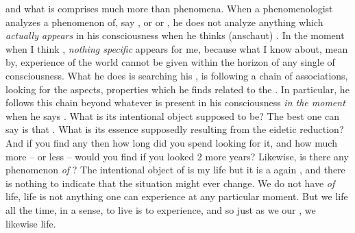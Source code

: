 \pa
{} and what is 
comprises much more than phenomena.  When a phenomenologist analyzes a
phenomenon of, say , or  or , he does not
analyze anything which {\em actually appears} in his consciousness when he
thinks (anschaut) .  In the moment when I think , {\em
  nothing specific} appears for me, because what I know about, mean by,
experience of the world cannot be given within the horizon of any single
 of consciousness.  What he does is searching his , is
following a chain of associations, looking for the aspects, properties which he
finds related to the .  In particular, he follows this chain beyond
whatever is present in his consciousness {\em in the moment} when he says
.  What is its intentional object supposed to be?  The best one can say
is that .  What is its essence supposedly resulting from the eidetic reduction?
And if you find any then how long did you spend looking for it, and how much
more -- or less -- would you find if you looked 2 more years?
Likewise, is there any phenomenon {\em of} ?  The intentional object
of  is my life but it is a again
, and there is nothing to
indicate that the situation might ever change.  We do not have  {\em of} life, life is not anything one can experience at any
particular moment. But we  life all the time, in a sense, to live is
to experience, and so just as we  our , we
likewise  life.
%

